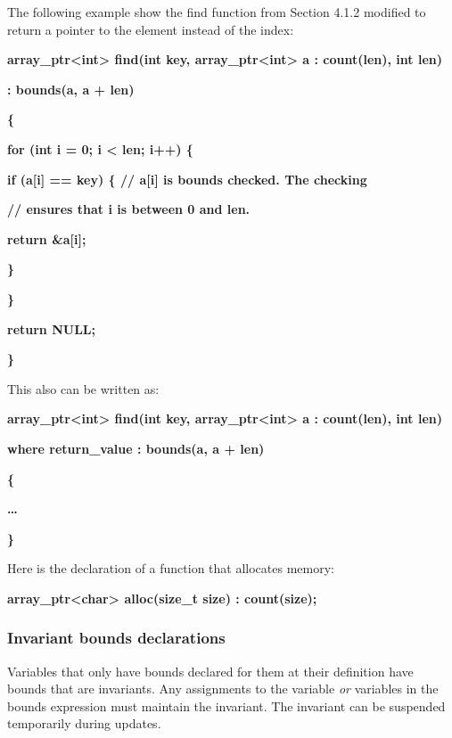 \documentclass[]{article}
\begin{document}
The following example show the find function from Section 4.1.2 modified
to return a pointer to the element instead of the index:

\textbf{array\_ptr\textless{}int\textgreater{} find(int key,
array\_ptr\textless{}int\textgreater{} a : count(len), int len)}

\textbf{: bounds(a, a + len)}

\textbf{\{}

\textbf{for (int i = 0; i \textless{} len; i++) \{}

\textbf{if (a{[}i{]} == key) \{ // a{[}i{]} is bounds checked. The
checking}

\textbf{// ensures that i is between 0 and len.}

\textbf{return \&a{[}i{]};}

\textbf{\}}

\textbf{\}}

\textbf{return NULL;}

\textbf{\}}

This also can be written as:

\textbf{array\_ptr\textless{}int\textgreater{} find(int key,
array\_ptr\textless{}int\textgreater{} a : count(len), int len)}

\textbf{where return\_value : bounds(a, a + len)}

\textbf{\{}

\textbf{\ldots{}}

\textbf{\}}

Here is the declaration of a function that allocates memory:

\textbf{array\_ptr\textless{}char\textgreater{} alloc(size\_t size) :
count(size);}

\subsubsection{\texorpdfstring{\protect\hypertarget{ux5fToc435434932}{}{\protect\hypertarget{ux5fToc437460753}{}{\protect\hypertarget{ux5fToc440445431}{}{\protect\hypertarget{ux5fToc440449213}{}{\protect\hypertarget{ux5fToc440551863}{}{\protect\hypertarget{ux5fToc426641078}{}{}}}}}}Invariant
bounds
declarations}{Invariant bounds declarations}}\label{invariant-bounds-declarations}

Variables that only have bounds declared for them at their definition
have bounds that are invariants. Any assignments to the variable
\emph{or} variables in the bounds expression must maintain the
invariant. The invariant can be suspended temporarily during updates.
\end{document}
